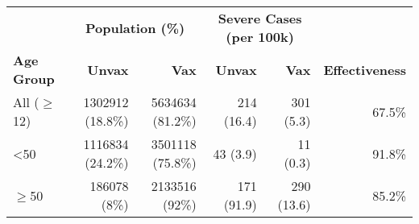 \begin{table}[ht]
\centering
\begin{tabular}{lrrrrr}
  \toprule
  & \multicolumn{2}{c}{\textbf{Population (\%)}} & \multicolumn{2}{c}{\textbf{Severe Cases (per 100k)}} & \\
 \cmidrule(lr){2-3} \cmidrule(lr){4-5}
 \textbf{Age Group} & \textbf{Unvax} & \textbf{Vax} & \textbf{Unvax} & \textbf{Vax} & \textbf{Effectiveness} \\
 \midrule
All ($\geq$12) & 1302912 (18.8\%) & 5634634 (81.2\%) & 214 (16.4) & 301 (5.3) & 67.5\% \\ 
  <50 & 1116834 (24.2\%) & 3501118 (75.8\%) & 43 (3.9) & 11 (0.3) & 91.8\% \\ 
  $\geq$50 & 186078 (8\%) & 2133516 (92\%) & 171 (91.9) & 290 (13.6) & 85.2\% \\ 
   \bottomrule
\end{tabular}
\end{table}
